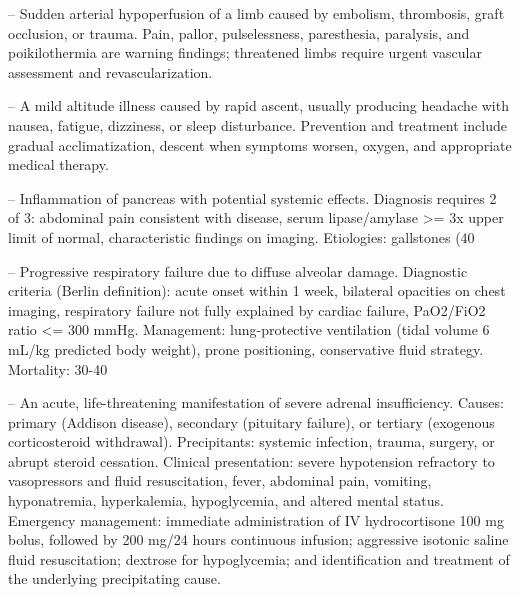 -- Sudden arterial hypoperfusion of a limb caused by embolism, thrombosis, graft occlusion, or trauma. Pain, pallor, pulselessness, paresthesia, paralysis, and poikilothermia are warning findings; threatened limbs require urgent vascular assessment and revascularization.

-- A mild altitude illness caused by rapid ascent, usually producing headache with nausea, fatigue, dizziness, or sleep disturbance. Prevention and treatment include gradual acclimatization, descent when symptoms worsen, oxygen, and appropriate medical therapy.

-- Inflammation of pancreas with potential systemic effects. Diagnosis requires 2 of 3: abdominal pain consistent with disease, serum lipase/amylase >= 3x upper limit of normal, characteristic findings on imaging. Etiologies: gallstones (40%

-- Progressive respiratory failure due to diffuse alveolar damage. Diagnostic criteria (Berlin definition): acute onset within 1 week, bilateral opacities on chest imaging, respiratory failure not fully explained by cardiac failure, PaO2/FiO2 ratio <= 300 mmHg. Management: lung-protective ventilation (tidal volume 6 mL/kg predicted body weight), prone positioning, conservative fluid strategy. Mortality: 30-40%

-- An acute, life-threatening manifestation of severe adrenal insufficiency. Causes: primary (Addison disease), secondary (pituitary failure), or tertiary (exogenous corticosteroid withdrawal). Precipitants: systemic infection, trauma, surgery, or abrupt steroid cessation. Clinical presentation: severe hypotension refractory to vasopressors and fluid resuscitation, fever, abdominal pain, vomiting, hyponatremia, hyperkalemia, hypoglycemia, and altered mental status. Emergency management: immediate administration of IV hydrocortisone 100 mg bolus, followed by 200 mg/24 hours continuous infusion; aggressive isotonic saline fluid resuscitation; dextrose for hypoglycemia; and identification and treatment of the underlying precipitating cause.

